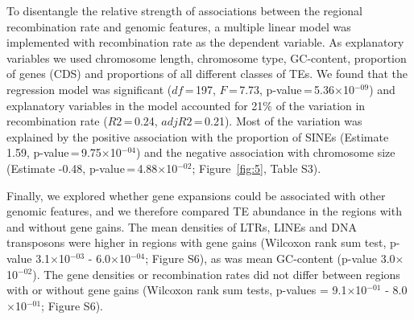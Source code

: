 \documentclass[twocolumn]{bmcart}%
\begin{document}
To disentangle the relative strength of associations between the regional recombination rate and genomic features, a multiple linear model was implemented with recombination rate as the dependent variable. As explanatory variables we used chromosome length, chromosome type, GC-content, proportion of genes (CDS) and proportions of all different classes of TEs. We found that the regression model was significant ($df$\,=\,197, $F$\,=\,7.73, p-value\,=\,5.36$\times$10$^{-09}$) and explanatory variables in the model accounted for 21\% of the variation in recombination rate ($R2$\,=\,0.24, $adj R2$\,=\,0.21). Most of the variation was explained by the positive association with the proportion of SINEs (Estimate 1.59, p-value\,=\,9.75$\times$10$^{-04}$) and the negative association with chromosome size (Estimate -0.48, p-value\,=\,4.88$\times$10$^{-02}$; Figure~\ref{fig:5},  Table S3).

Finally, we explored whether gene expansions could be associated with other genomic features, and we therefore compared TE abundance in the regions with and without gene gains. The mean densities of LTRs, LINEs and DNA transposons were higher in regions with gene gains (Wilcoxon rank sum test, p-value 3.1$\times$10$^{-03}$ - 6.0$\times$10$^{-04}$; Figure S6), as was mean GC-content (p-value 3.0$\times$10$^{-02}$). The gene densities or recombination rates did not differ between regions with or without gene gains (Wilcoxon rank sum tests, p-values = 9.1$\times$10$^{-01}$ - 8.0$\times$10$^{-01}$; Figure S6).
\end{document}
